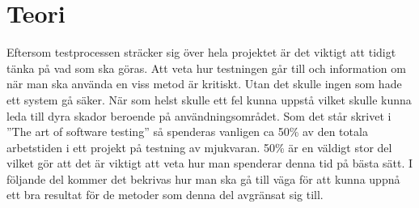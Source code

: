 \section{Teori}
	Eftersom testprocessen sträcker sig över hela projektet är det viktigt att tidigt tänka på vad som ska göras. Att veta hur testningen går till och information om när man ska använda en viss metod är kritiskt. Utan det skulle ingen som hade ett system gå säker. När som helst skulle ett fel kunna uppstå vilket skulle kunna leda till dyra skador beroende på användningsområdet. \newline
	Som det står skrivet i ''The art of software testing'' \citep{taost} så spenderas vanligen ca 50\% av den totala arbetstiden i ett projekt på testning av mjukvaran. 50\% är en väldigt stor del vilket gör att det är viktigt att veta hur man spenderar denna tid på bästa sätt. I följande del kommer det bekrivas hur man ska gå till väga för att kunna uppnå ett bra resultat för de metoder som denna del avgränsat sig till.